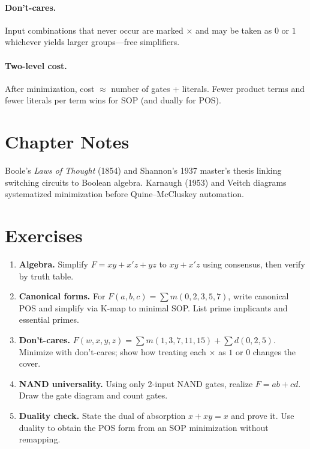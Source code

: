 \paragraph{Don't-cares.} Input combinations that never occur are marked $\times$ and may be taken as $0$ or $1$ whichever yields larger groups---free simplifiers.

\paragraph{Two-level cost.} After minimization, cost $\approx$ number of gates + literals. Fewer product terms and fewer literals per term wins for SOP (and dually for POS).

\section{Chapter Notes}
Boole's \emph{Laws of Thought} (1854) and Shannon's 1937 master's thesis linking switching circuits to Boolean algebra. Karnaugh (1953) and Veitch diagrams systematized minimization before Quine--McCluskey automation.

\section{Exercises}
\label{sec:ch02-exercises}
\begin{enumerate}[label=E2.\arabic*, leftmargin=*, itemsep=0.8em]
    \item \textbf{Algebra.} Simplify $F=x y + x' z + y z$ to $x y + x' z$ using consensus, then verify by truth table.
    \item \textbf{Canonical forms.} For $F(a,b,c)=\sum m(0,2,3,5,7)$, write canonical POS and simplify via K-map to minimal SOP. List prime implicants and essential primes.
    \item \textbf{Don't-cares.} $F(w,x,y,z)=\sum m(1,3,7,11,15)+\sum d(0,2,5)$. Minimize with don't-cares; show how treating each $\times$ as $1$ or $0$ changes the cover.
    \item \textbf{NAND universality.} Using only 2-input NAND gates, realize $F=ab+cd$. Draw the gate diagram and count gates.
    \item \textbf{Duality check.} State the dual of absorption $x+x y=x$ and prove it. Use duality to obtain the POS form from an SOP minimization without remapping.
\end{enumerate}
